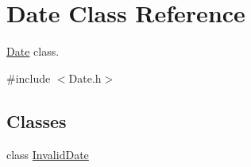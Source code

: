 \hypertarget{class_date}{\section{Date Class Reference}
\label{class_date}
}


\hyperlink{class_date}{Date} class.  




{\ttfamily \#include $<$Date.\+h$>$}

\subsection*{Classes}
\begin{DoxyCompactItemize}
\item 
class \hyperlink{class_date_1_1_invalid_date}{Invalid\+Date}
\end{DoxyCompactItemize}
